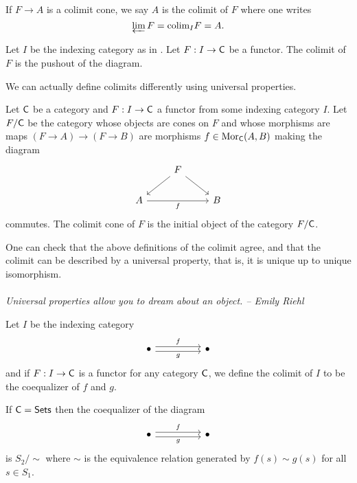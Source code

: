 If $F\to A$ is a colimit cone, we say $A$ is the colimit of $F$ where one writes $$\varprojlim F=\mathrm{colim}_{I}F=A.$$
\begin{example}[Pushout]
  Let $I$ be the indexing category as in . Let $F:I\to\mathsf{C}$ be a functor. The colimit of $F$ is the pushout of the diagram. 
\end{example}
We can actually define colimits differently using universal properties. 
\begin{definition}
  Let $\mathsf{C}$ be a category and $F:I\to\mathsf{C}$ a functor from some indexing category $I$. Let $F/\mathsf{C}$ be the category whose objects are cones on $F$ and whose morphisms are maps $(F\to A)\to(F\to B)$ are morphisms $f\in\mathrm{Mor}_{\mathsf{C}}(A,B)$ making the diagram 
  $$%
  \begin{tikzcd}
    & F \\
    A && B
    \arrow["f"', from=2-1, to=2-3]
    \arrow[from=1-2, to=2-1]
    \arrow[from=1-2, to=2-3]
  \end{tikzcd}$$
  commutes. The colimit cone of $F$ is the initial object of the category $F/\mathsf{C}$. 
\end{definition}
One can check that the above definitions of the colimit agree, and that the colimit can be described by a universal property, that is, it is unique up to unique isomorphism. \\\\
\emph{Universal properties allow you to dream about an object. -- Emily Riehl}
\begin{definition}[Coequalizer]\label{def:coequalizer}
  Let $I$ be the indexing category 
  $$%
  \begin{tikzcd}
    \bullet && \bullet
    \arrow["f", shift left, from=1-1, to=1-3]
    \arrow["g"', shift right, from=1-1, to=1-3]
  \end{tikzcd}$$
  and if $F:I\to\mathsf{C}$ is a functor for any category $\mathsf{C}$, we define the colimit of $I$ to be the coequalizer of $f$ and $g$. 
\end{definition}
\begin{example}
  If $\mathsf{C}=\mathsf{Sets}$ then the coequalizer of the diagram 
  $$%
  \begin{tikzcd}
    \bullet && \bullet
    \arrow["f", shift left, from=1-1, to=1-3]
    \arrow["g"', shift right, from=1-1, to=1-3]
  \end{tikzcd}$$
  is $S_{2}/\sim$ where $\sim$ is the equivalence relation generated by $f(s)\sim g(s)$ for all $s\in S_{1}$. 
\end{example}
